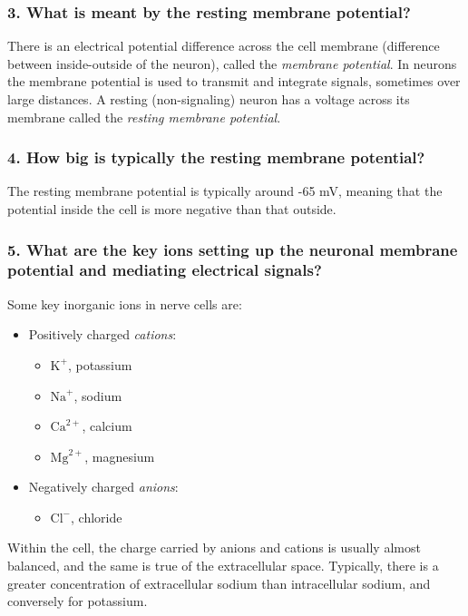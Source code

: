 \subsubsection{3. What is meant by the resting membrane potential?}

There is an electrical potential difference across the cell membrane (difference between inside-outside of the neuron), called the \textit{membrane potential}. In neurons the membrane potential is used to transmit and integrate signals, sometimes over large distances. A resting (non-signaling) neuron has a voltage across its membrane called the \textit{resting membrane potential}. 

\subsubsection{4. How big is typically the resting membrane potential?}

The resting membrane potential is typically around -65 mV, meaning that the potential inside the cell is more negative than that outside.

\subsubsection{5. What are the key ions setting up the neuronal membrane potential and mediating electrical signals?}

Some key inorganic ions in nerve cells are: 

\begin{itemize}
    \item Positively charged \textit{cations}:
    \begin{itemize}
        \item $\mathrm{K}^+$, potassium
        \item $\mathrm{Na}^+$, sodium 
        \item $\mathrm{Ca}^{2+}$, calcium
        \item $\mathrm{Mg}^{2+}$, magnesium
    \end{itemize}
    \item Negatively charged \textit{anions}:
    \begin{itemize}
        \item $\mathrm{Cl}^-$, chloride
    \end{itemize}
\end{itemize}
    

Within the cell, the charge carried by anions and cations is usually almost balanced, and the same is true of the extracellular space. Typically, there is a greater concentration of extracellular sodium than intracellular sodium, and conversely for potassium. 

